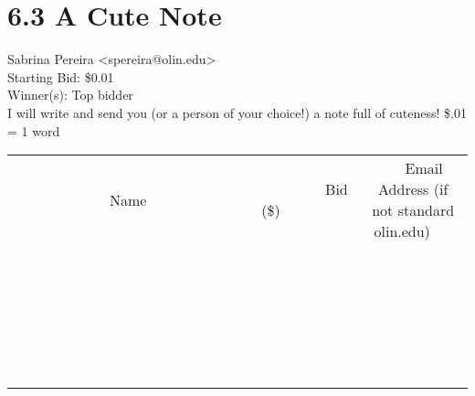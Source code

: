 \documentclass[11pt]{article}
\begin{document}
					\section*{6.3 A Cute Note}
					Sabrina Pereira <spereira@olin.edu> \\
					Starting Bid: \$0.01 \\
					Winner(s): Top bidder \\
					I will write and send you (or a person of your choice!) a note full of cuteness! \$.01 = 1 word \\
					[6ex]
					\begin{tabular}{c c c}
						~~~~~~~~~~~~~Name~~~~~~~~~~~~~ & ~~~~~~~~~Bid (\$)~~~~~~~~~ & ~~~Email Address (if not standard olin.edu)~~~ \\
				
 & & \\
\hline
 & & \\
\hline
 & & \\
\hline
 & & \\
\hline
 & & \\
\hline
 & & \\
\hline
 & & \\
\hline
 & & \\
\hline
 & & \\
\hline
 & & \\
\hline
 & & \\
\hline
 & & \\
\hline
 & & \\
\hline
 & & \\
\hline
 & & \\
\hline
 & & \\
\hline
 & & \\
\hline
 & & \\
\hline
 & & \\
\hline
 & & \\
\hline
 & & \\
\hline
 & & \\
\hline
 & & \\
\hline
 & & \\
\hline
 & & \\
\hline
 & & \\
\hline
					\end{tabular}
					\clearpage
				
\end{document}
